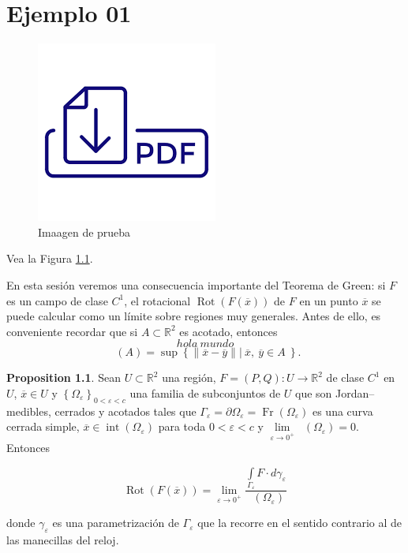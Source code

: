 \documentclass[
]{krantz}
\theoremstyle{definition}
\renewcommand{\epsilon}{\varepsilon}  %
\newtheorem{proposition}{Proposition}[chapter]
\theoremstyle{definition}
\theoremstyle{definition}
\theoremstyle{definition}
\theoremstyle{remark}
\begin{document}
\hypertarget{ejemplo-01}{%
\chapter{Ejemplo 01}\label{ejemplo-01}}

\begin{figure}

{\centering \includegraphics[width=0.3\linewidth]{images/descargarpdf} 

}

\caption{Imaagen de prueba}\label{fig:logopdf}
\end{figure}

Vea la Figura \ref{fig:logopdf}.

En esta sesión veremos una consecuencia importante del Teorema de Green: si \(F\) es un campo de clase \(C^1\), el rotacional \(\mathop{\mathrm{Rot}}\left( F(\overline{x}) \right)\) de \(F\) en un punto \(\overline{x}\) se puede calcular como un límite sobre regiones muy generales. Antes de ello, es conveniente recordar que si \(A\subset\mathbb{R}^2\) es acotado, entonces
\[
    hola\ mundo
  \]
\begin{equation*}
        \mathop{\mathrm{di\acute{a}m}}(A) = \sup \left\{ \|\overline{x} - \overline{y}\| \left\lvert \ \overline{x},\ \overline{y}\in A \right.  \  \right\} .
\end{equation*}

\begin{proposition}
\protect\hypertarget{prp:prop01}{}{\label{prp:prop01} }Sean \(U\subset\mathbb{R}^2\) una región, \(F = \left(P, Q\right): U\to \mathbb{R}^2\) de clase \(C^1\) en \(U\), \(\overline{x}\in U\) y \(\left\{ \Omega_{\epsilon} \right\}_{0<\epsilon <c}\) una familia de subconjuntos de \(U\) que son Jordan--medibles, cerrados y acotados tales que \(\Gamma_{\epsilon} = \partial \Omega_{\epsilon} = \mathop{\mathrm{Fr}}\left( \Omega_{\epsilon}\right)\) es una curva cerrada simple, \(\overline{x}\in\mathop{\mathrm{int}}\left(\Omega_{\epsilon}\right)\) para toda \(0 < \epsilon < c\) y \(\lim\limits_{\epsilon\to 0^{+}} \mathop{\mathrm{di\acute{a}m}}\left(\Omega_{\epsilon}\right) = 0\). Entonces

\begin{equation*}
            \mathop{\mathrm{Rot}}\left( F(\overline{x})\right) = \lim\limits_{\epsilon\to 0^{+}} \frac{\displaystyle\int\limits_{\Gamma_{\epsilon}} F\cdot d\gamma_{\epsilon}}{\mathop{\mathrm{\acute{a}rea}}\left( \Omega_{\epsilon}\right)}
\end{equation*}

donde \(\gamma_{\epsilon}\) es una parametrización de \(\Gamma_{\epsilon}\) que la recorre en el sentido contrario al de las manecillas del reloj.
\end{proposition}
\end{document}
